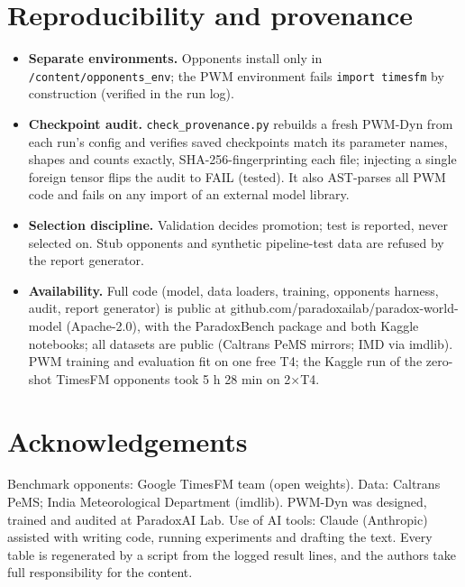 \documentclass[
  10pt,
]{article}
\providecommand{\tightlist}{%
  \setlength{\itemsep}{0pt}\setlength{\parskip}{0pt}}
\begin{document}
\section{Reproducibility and provenance}

\begin{itemize}
\tightlist
\item
  \textbf{Separate environments.} Opponents install only in
  \texttt{/content/opponents\_env}; the PWM environment fails
  \texttt{import\ timesfm} by construction (verified in the run log).
\item
  \textbf{Checkpoint audit.} \texttt{check\_provenance.py} rebuilds a
  fresh PWM-Dyn from each run's config and verifies saved checkpoints
  match its parameter names, shapes and counts exactly,
  SHA-256-fingerprinting each file; injecting a single foreign tensor
  flips the audit to FAIL (tested). It also AST-parses all PWM code and
  fails on any import of an external model library.
\item
  \textbf{Selection discipline.} Validation decides promotion; test is
  reported, never selected on. Stub opponents and synthetic
  pipeline-test data are refused by the report generator.
\item
  \textbf{Availability.} Full code (model, data loaders, training,
  opponents harness, audit, report generator) is public at
  github.com/paradoxailab/paradox-world-model (Apache-2.0), with the
  ParadoxBench package and both Kaggle notebooks; all datasets are
  public (Caltrans PeMS mirrors; IMD via imdlib). PWM training and
  evaluation fit on one free T4; the Kaggle run of the zero-shot TimesFM opponents took 5 h 28 min on
  2×T4.
\end{itemize}

\section*{Acknowledgements}

Benchmark opponents: Google TimesFM team (open weights). Data: Caltrans
PeMS; India Meteorological Department (imdlib). PWM-Dyn was designed,
trained and audited at ParadoxAI Lab. Use of AI tools: Claude
(Anthropic) assisted with writing code, running experiments and drafting
the text. Every table is regenerated by a script from the logged result
lines, and the authors take full responsibility for the content.

\nocite{*}

\end{document}
